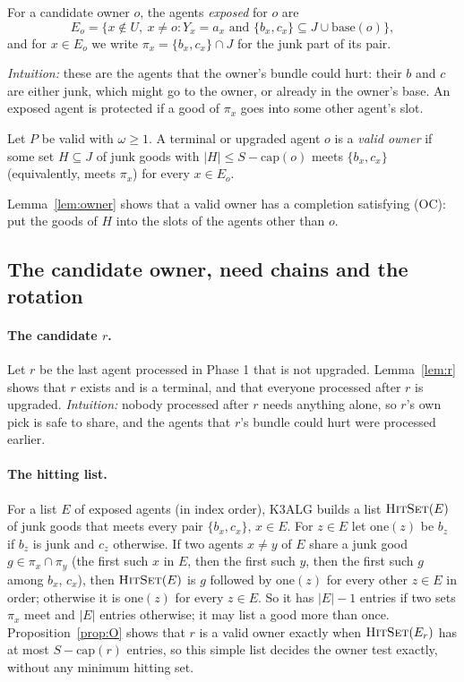 \documentclass[runningheads,11pt]{llncs}
\newcommand{\capa}{\mathrm{cap}}
\newcommand{\base}{\mathrm{base}}
\newcommand{\st}{\mathrel{:}}
\newcommand{\HitSet}{\textup{\textsc{HitSet}}}
\begin{document}
\begin{definition}\label{def:exposed}
For a candidate owner $o$, the agents \emph{exposed} for $o$ are
\[
  E_o=\{x\notin U,\ x\ne o\st Y_x=a_x \text{ and } \{b_x,c_x\}\subseteq J\cup\base(o)\},
\]
and for $x\in E_o$ we write $\pi_x=\{b_x,c_x\}\cap J$ for the junk part of its pair.
\end{definition}

\noindent \emph{Intuition:} these are the agents that the owner's bundle could hurt: their $b$ and $c$ are either junk, which might go to the owner, or already in the owner's base. An exposed agent is protected if a good of $\pi_x$ goes into some other agent's slot.

\begin{definition}\label{def:validowner}
Let $P$ be valid with $\omega\ge1$. A terminal or upgraded agent $o$ is a \emph{valid owner} if some set $H\subseteq J$ of junk goods with $|H|\le S-\capa(o)$ meets $\{b_x,c_x\}$ (equivalently, meets $\pi_x$) for every $x\in E_o$.
\end{definition}

\noindent Lemma~\ref{lem:owner} shows that a valid owner has a completion satisfying (OC): put the goods of $H$ into the slots of the agents other than $o$.

\subsection{The candidate owner, need chains and the rotation}\label{sec:owner}

\paragraph{The candidate $r$.} Let $r$ be the last agent processed in Phase 1 that is not upgraded. Lemma~\ref{lem:r} shows that $r$ exists and is a terminal, and that everyone processed after $r$ is upgraded. \emph{Intuition:} nobody processed after $r$ needs anything alone, so $r$'s own pick is safe to share, and the agents that $r$'s bundle could hurt were processed earlier.

\paragraph{The hitting list.} For a list $E$ of exposed agents (in index order), K3ALG builds a list $\HitSet(E)$ of junk goods that meets every pair $\{b_x,c_x\}$, $x\in E$. For $z\in E$ let $\mathrm{one}(z)$ be $b_z$ if $b_z$ is junk and $c_z$ otherwise. If two agents $x\ne y$ of $E$ share a junk good $g\in\pi_x\cap\pi_y$ (the first such $x$ in $E$, then the first such $y$, then the first such $g$ among $b_x$, $c_x$), then $\HitSet(E)$ is $g$ followed by $\mathrm{one}(z)$ for every other $z\in E$ in order; otherwise it is $\mathrm{one}(z)$ for every $z\in E$. So it has $|E|-1$ entries if two sets $\pi_x$ meet and $|E|$ entries otherwise; it may list a good more than once. Proposition~\ref{prop:O} shows that $r$ is a valid owner exactly when $\HitSet(E_r)$ has at most $S-\capa(r)$ entries, so this simple list decides the owner test exactly, without any minimum hitting set.
\end{document}
